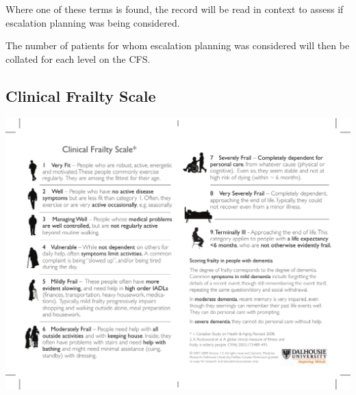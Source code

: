 \documentclass[12pt,a4paper,oneside,titlepage]{article}
\begin{document}
Where one of these terms is found, the record will be read in context to assess if 
escalation planning was being considered.

The number of patients for whom escalation planning was considered will then be 
collated for each level on the CFS.


\clearpage
\printbibliography[prenote=needsfixing]

\clearpage
\begin{appendix}
\section{Clinical Frailty Scale}
\label{appendix:CFS}
\includegraphics[width=\textwidth]{CFS}
\end{appendix}
\end{document}
